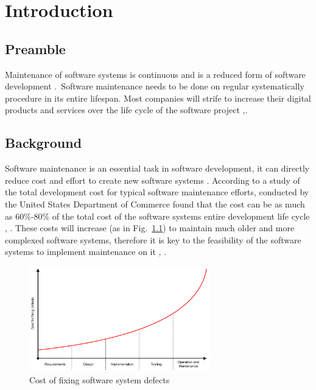 \chapter{Introduction}
\label{chap:1}

\section{Preamble}
Maintenance of software systems is continuous and is a reduced form of software
development \cite{Sneed2004}.~Software maintenance needs to be done on regular
systematically procedure in its entire lifespan. Most companies will strife to increase their digital products and services over the life cycle of the software project \cite{Niu2018},\cite{Galster2019}.

\section{Background}
Software maintenance is an essential task in software development, it can directly reduce cost and effort to create new software systems \cite{FrancisThamburaj2017}. According to a study of the total development cost for typical software maintenance efforts, conducted by the United States Department of Commerce found that the cost can be as much as $60\%$-$80\%$ of the total cost of the software systems entire development life cycle \cite{Ogheneovo2014}, \cite{Stark1996}. These costs will increase (as in Fig.~\ref{fig:CH1_Costs_of_fixing_bugs}) to maintain much older and more complexed software systems, therefore it is key to the feasibility of the software systems to implement maintenance on it \cite{Alenezi2016}, \cite{Booch1986}.

\begin{figure}[!htb] %
    \centering %
    \includegraphics[width=0.7\textwidth]{Images/Chapter1/Background/Cost_of_fixing_bugs/Cost_of_fixing_bugs.pdf}
    \caption{Cost of fixing software system defects \cite{Ogheneovo2014}}\label{fig:CH1_Costs_of_fixing_bugs}
\end{figure} 


